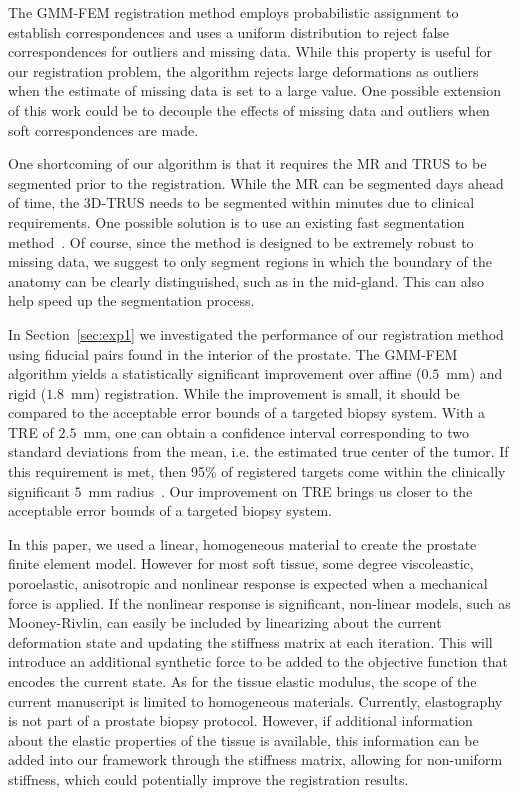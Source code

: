 \documentclass[journal]{IEEEtran}
\begin{document}
The GMM-FEM registration method employs probabilistic assignment to establish correspondences and uses a uniform distribution to reject false correspondences for outliers and missing data. While this property is useful for our registration problem, the algorithm rejects large deformations as outliers when the estimate of missing data is set to a large value. One possible extension of this work could be to decouple the effects of missing data and outliers when soft correspondences are made.

One shortcoming of our algorithm is that it requires the MR and TRUS to be segmented prior to the registration. While the MR can be segmented days ahead of time, the 3D-TRUS needs to be segmented within minutes due to clinical requirements. One possible solution is to use an existing fast segmentation method~\cite{Qiu12a}. Of course, since the method is designed to be extremely robust to missing data, we suggest to only segment regions in which the boundary of the anatomy can be clearly distinguished, such as in the mid-gland. This can also help speed up the segmentation process.

In Section~\ref{sec:exp1} we investigated the performance of our registration method using fiducial pairs found in the interior of the prostate. The GMM-FEM algorithm yields a statistically significant improvement over affine ($0.5$~mm) and rigid ($1.8$~mm) registration. While the improvement is small, it should be compared to the acceptable error bounds of a targeted biopsy system. With a TRE of $2.5$~mm, one can obtain a confidence interval corresponding to two standard deviations from the mean, i.e. the estimated true center of the tumor. If this requirement is met, then 95\% of registered targets come within the clinically significant $5$~mm radius~\cite{Karnik10a}. Our improvement on TRE brings us closer to the acceptable error bounds of a targeted biopsy system.

In this paper, we used a linear, homogeneous material to create the prostate finite element model. However for most soft tissue, some degree viscoleastic, poroelastic, anisotropic and nonlinear response is expected when a mechanical force is applied. If the nonlinear response is significant, non-linear models, such as Mooney-Rivlin, can easily be included by linearizing about the current deformation state and updating the stiffness matrix at each iteration. This will introduce an additional synthetic force to be added to the objective function that encodes the current state. As for the tissue elastic modulus, the scope of the current manuscript is limited to homogeneous materials. Currently, elastography is not part of a prostate biopsy protocol. However, if additional information about the elastic properties of the tissue is available, this information can be added into our framework through the stiffness matrix, allowing for non-uniform stiffness, which could potentially improve the registration results.
\end{document}
